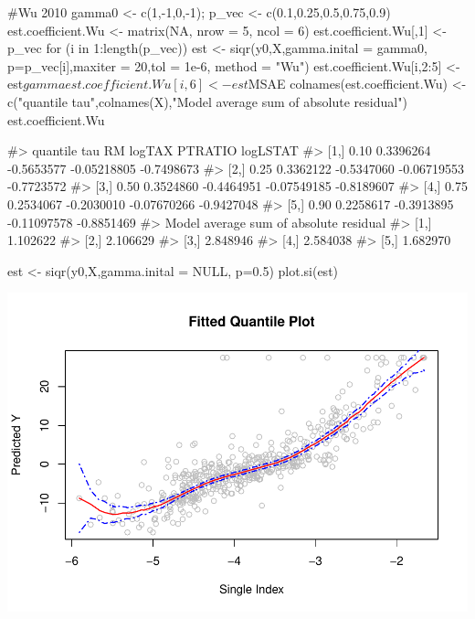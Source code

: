 \begin{Schunk}
\begin{Sinput}
#Wu 2010
gamma0 <- c(1,-1,0,-1);
p_vec <- c(0.1,0.25,0.5,0.75,0.9)
est.coefficient.Wu <- matrix(NA, nrow = 5, ncol = 6)
est.coefficient.Wu[,1] <- p_vec
for (i in 1:length(p_vec)){
  est <- siqr(y0,X,gamma.inital = gamma0, p=p_vec[i],maxiter = 20,tol = 1e-6, method = "Wu")
  est.coefficient.Wu[i,2:5] <- est$gamma
  est.coefficient.Wu[i,6]   <- est$MSAE
}
colnames(est.coefficient.Wu) <- c("quantile tau",colnames(X),"Model average sum of absolute residual")
est.coefficient.Wu
\end{Sinput}
\begin{Soutput}
#>      quantile tau        RM     logTAX     PTRATIO   logLSTAT
#> [1,]         0.10 0.3396264 -0.5653577 -0.05218805 -0.7498673
#> [2,]         0.25 0.3362122 -0.5347060 -0.06719553 -0.7723572
#> [3,]         0.50 0.3524860 -0.4464951 -0.07549185 -0.8189607
#> [4,]         0.75 0.2534067 -0.2030010 -0.07670266 -0.9427048
#> [5,]         0.90 0.2258617 -0.3913895 -0.11097578 -0.8851469
#>      Model average sum of absolute residual
#> [1,]                               1.102622
#> [2,]                               2.106629
#> [3,]                               2.848946
#> [4,]                               2.584038
#> [5,]                               1.682970
\end{Soutput}
\end{Schunk}

\begin{Schunk}
\begin{Sinput}
est <- siqr(y0,X,gamma.inital = NULL, p=0.5)
plot.si(est)
\end{Sinput}

\includegraphics{siqr_files/figure-latex/unnamed-chunk-3-1} \end{Schunk}

